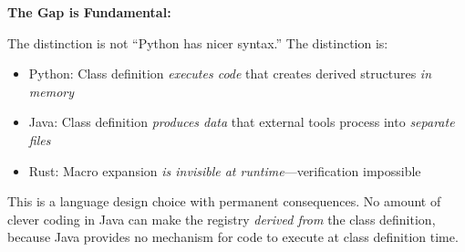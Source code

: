 \textbf{The Gap is Fundamental:}

The distinction is not ``Python has nicer syntax.'' The distinction is:
\begin{itemize}
\tightlist
\item Python: Class definition \emph{executes code} that creates derived structures \emph{in memory}
\item Java: Class definition \emph{produces data} that external tools process into \emph{separate files}
\item Rust: Macro expansion \emph{is invisible at runtime}---verification impossible
\end{itemize}

This is a language design choice with permanent consequences. No amount of clever coding in Java can make the registry \emph{derived from} the class definition, because Java provides no mechanism for code to execute at class definition time.

